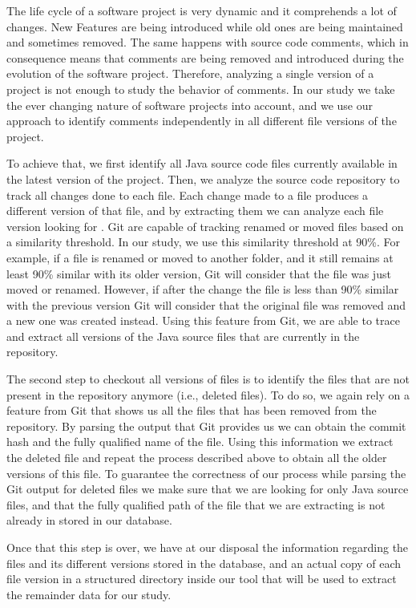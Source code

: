 The life cycle of a software project is very dynamic and it comprehends a lot of changes. New Features are being introduced while old ones are being maintained and sometimes removed. The same happens with source code comments, which in consequence means that \SATD comments are being removed and introduced during the evolution of the software project. Therefore, analyzing a single version of a project is not enough to study the behavior of \SATD comments. In our study we take the ever changing nature of software projects into account, and we use our approach to identify \SATD comments independently in all different file versions of the project.

To achieve that, we first identify all Java source code files currently available in the latest version of the project. Then, we analyze the source code repository to track all changes done to each file. Each change made to a file produces a different version of that file, and by extracting them we can analyze each file version looking for \SATD. Git are capable of tracking  renamed or moved files based on a similarity threshold. In our study, we use this similarity threshold at 90\%. For example, if a file is renamed or moved to another folder, and it still remains at least 90\% similar with its older version, Git will consider that the file was just moved or renamed. However, if after the change the file is less than 90\% similar with the previous version Git will consider that the original file was removed and a new one was created instead. Using this feature from Git, we are able to trace and extract all versions of the Java source files that are currently in the repository. 

The second step to checkout all versions of files is to identify the files that are not present in the repository anymore (i.e., deleted files). To do so, we again rely on a feature from Git that shows us all the files that has been removed from the repository. By parsing the output that Git provides us we can obtain the commit hash and the fully qualified name of the file. Using this information we extract the deleted file and repeat the process described above to obtain all the older versions of this file. To guarantee the correctness of our process while parsing the Git output for deleted files we make sure that we are looking for only Java source files, and that the fully qualified path of the file that we are extracting is not already in stored in our database. 

Once that this step is over, we have at our disposal the information regarding the files and its different versions stored in the database, and an actual copy of each file version in a structured directory inside our tool that will be used to extract the remainder data for our study.

